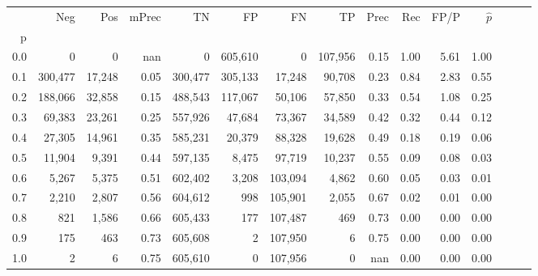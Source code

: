 \begin{tabular}{rrrrrrrrrrrrrrr}
\toprule
{} &      Neg &     Pos & mPrec &       TN &       FP &       FN &       TP &  Prec &   Rec &  FP/P & $\hat{p}$ \\
p   &          &         &       &          &          &          &          &       &       &       &           \\
\midrule
0.0 &        0 &       0 &   nan &        0 &  605,610 &        0 &  107,956 &  0.15 &  1.00 &  5.61 &      1.00 \\
0.1 &  300,477 &  17,248 &  0.05 &  300,477 &  305,133 &   17,248 &   90,708 &  0.23 &  0.84 &  2.83 &      0.55 \\
0.2 &  188,066 &  32,858 &  0.15 &  488,543 &  117,067 &   50,106 &   57,850 &  0.33 &  0.54 &  1.08 &      0.25 \\
0.3 &   69,383 &  23,261 &  0.25 &  557,926 &   47,684 &   73,367 &   34,589 &  0.42 &  0.32 &  0.44 &      0.12 \\
0.4 &   27,305 &  14,961 &  0.35 &  585,231 &   20,379 &   88,328 &   19,628 &  0.49 &  0.18 &  0.19 &      0.06 \\
0.5 &   11,904 &   9,391 &  0.44 &  597,135 &    8,475 &   97,719 &   10,237 &  0.55 &  0.09 &  0.08 &      0.03 \\
0.6 &    5,267 &   5,375 &  0.51 &  602,402 &    3,208 &  103,094 &    4,862 &  0.60 &  0.05 &  0.03 &      0.01 \\
0.7 &    2,210 &   2,807 &  0.56 &  604,612 &      998 &  105,901 &    2,055 &  0.67 &  0.02 &  0.01 &      0.00 \\
0.8 &      821 &   1,586 &  0.66 &  605,433 &      177 &  107,487 &      469 &  0.73 &  0.00 &  0.00 &      0.00 \\
0.9 &      175 &     463 &  0.73 &  605,608 &        2 &  107,950 &        6 &  0.75 &  0.00 &  0.00 &      0.00 \\
1.0 &        2 &       6 &  0.75 &  605,610 &        0 &  107,956 &        0 &   nan &  0.00 &  0.00 &      0.00 \\
\bottomrule
\end{tabular}
